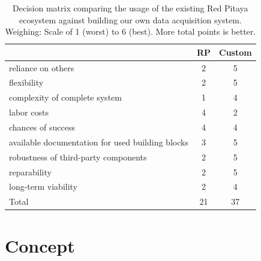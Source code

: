 \begin{table}
    \centering
    \caption{%
        Decision   matrix   comparing   the   usage  of   the   existing   Red
        Pitaya   ecosystem  against   building   our   own  data   acquisition
        system. Weighing: Scale  of \num{1}  (worst)  to \num{6}  (best). More
        total points is better.%
    }
    \label{tab:decision_matrix:pitaya_vs_own}
    \begin{tabular}{>{\raggedright}p{80mm}SS}
        \toprule
        & RP & Custom \\
        \midrule
        reliance on others &
        2 & 5 \\

        flexibility &
        2 & 5 \\

        complexity of complete system &
        1 & 4 \\

        labor costs &
        4 & 2 \\

        chances of success &
        4 & 4 \\

        available documentation for used building blocks &
        3 & 5 \\

        robustness of third-party components &
        2 & 5 \\

        reparability &
        2 & 5 \\

        long-term viability&
        2 & 4 \\
        \midrule
        Total & 21 & 37 \\
        \bottomrule
    \end{tabular}
\end{table}

%
%
\section{Concept} %
\label{sec:mission:concept}

